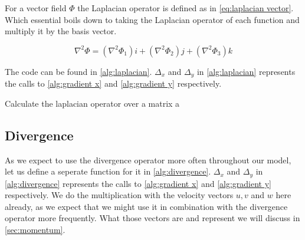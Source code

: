 For a vector field $\Phi$ the Laplacian operator is defined as in \autoref{eq:laplacian vector}. Which essential boils down to taking the Laplacian operator of each function and multiply it by
the basis vector.

\begin{equation}
    \nabla^2 \Phi = (\nabla^2 \Phi_1)i + (\nabla^2 \Phi_2)j + (\nabla^2 \Phi_3)k
    \label{eq:laplacian vector}
\end{equation}

The code can be found in \autoref{alg:laplacian}. $\Delta_x$ and $\Delta_y$ in \autoref{alg:laplacian} represents the calls to \autoref{alg:gradient x} and \autoref{alg:gradient y} 
respectively.

\begin{algorithm}[hbt]
    
     \;
    \caption{Calculate the laplacian operator over a matrix a}
    \label{alg:laplacian}
\end{algorithm}

\subsection{Divergence}
As we expect to use the divergence operator more often throughout our model, let us define a seperate function for it in \autoref{alg:divergence}. $\Delta_x$ and $\Delta_y$ in 
\autoref{alg:divergence} represents the calls to \autoref{alg:gradient x} and \autoref{alg:gradient y} respectively. We do the multiplication with the velocity vectors $u, v$ and $w$ here already, 
as we expect that we might use it in combination with the divergence operator more frequently. What those vectors are and represent we will discuss in \autoref{sec:momentum}.

